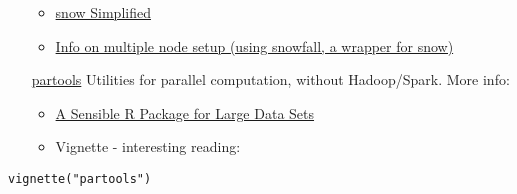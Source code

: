 \documentclass[a4paper, 11pt]{article}
\begin{document}
\begin{itemize}
\begin{itemize}
\item \href{http://www.sfu.ca/\~sblay/R/snow.html}{snow Simplified}
\item \href{https://stackoverflow.com/questions/17899756/initializing-mpi-cluster-with-snowfall-r}{Info on multiple node setup (using snowfall, a wrapper for snow)}
\end{itemize}
\item[{\href{https://cran.r-project.org/web/packages/partools/index.html}{partools}}] Utilities for parallel computation, without
Hadoop/Spark. More info:
\begin{itemize}
\item \href{https://matloff.wordpress.com/2015/08/05/partools-a-sensible-r-package-for-large-data-sets/}{A Sensible R Package for Large Data Sets}
\item Vignette - interesting reading:
\end{itemize}
\end{itemize}
\begin{verbatim}
vignette("partools")
\end{verbatim}
\end{document}
